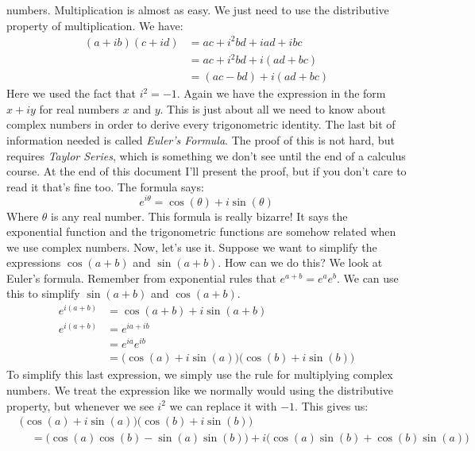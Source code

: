 \documentclass{article}
\theoremstyle{normal}
\theoremstyle{plain}
\begin{document}
    numbers. Multiplication is almost as easy. We just need to use the
    distributive property of multiplication. We have:
    \begin{align}
        (a+ib)(c+id)
            &=ac+i^{2}bd+iad+ibc\\
            &=ac+i^{2}bd+i(ad+bc)\\
            &=(ac-bd)+i(ad+bc)
    \end{align}
    Here we used the fact that $i^{2}=-1$. Again we have the expression in the
    form $x+iy$ for real numbers $x$ and $y$. This is just about all we need to
    know about complex numbers in order to derive every trigonometric identity.
    The last bit of information needed is called \textit{Euler's Formula}.
    The proof of this is not hard, but requires \textit{Taylor Series}, which
    is something we don't see until the end of a calculus course. At the end of
    this document I'll present the proof, but if you don't care to read it
    that's fine too. The formula says:
    \begin{equation}
        e^{i\theta}=\cos(\theta)+i\sin(\theta)
    \end{equation}
    Where $\theta$ is any real number. This formula is really bizarre! It says
    the exponential function and the trigonometric functions are somehow
    related when we use complex numbers. Now, let's use it. Suppose we want to
    simplify the expressions $\cos(a+b)$ and $\sin(a+b)$. How can we do this?
    We look at Euler's formula. Remember from exponential rules that
    $e^{a+b}=e^{a}e^{b}$. We can use this to simplify $\sin(a+b)$ and
    $\cos(a+b)$.
    \begin{align}
        e^{i(a+b)}&=\cos(a+b)+i\sin(a+b)\tag{Euler's Formula}\\
        e^{i(a+b)}&=e^{ia+ib}\tag{Distribute $i$}\\
            &=e^{ia}e^{ib}\tag{Exponential Property}\\
            &=\big(\cos(a)+i\sin(a)\big)\big(\cos(b)+i\sin(b)\big)
                \tag{Euler's Formula}
    \end{align}
    To simplify this last expression, we simply use the rule for multiplying
    complex numbers. We treat the expression like we normally would using the
    distributive property, but whenever we see $i^{2}$ we can replace it with
    $-1$. This gives us:
    \begin{align}
        &\big(\cos(a)+i\sin(a)\big)\big(\cos(b)+i\sin(b)\big)\nonumber\\
        &\quad=\big(\cos(a)\cos(b)-\sin(a)\sin(b)\big)+
            i\big(\cos(a)\sin(b)+\cos(b)\sin(a)\big)
    \end{align}
\end{document}
